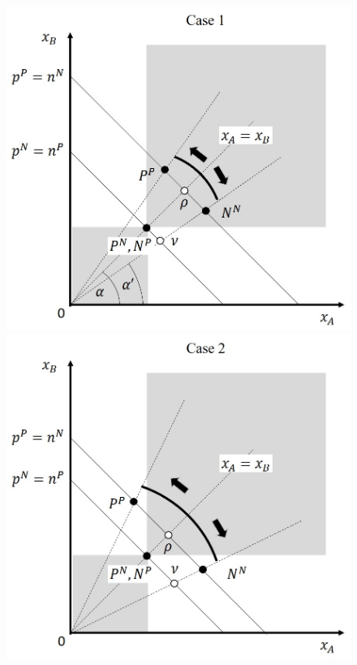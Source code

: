 \documentclass[smallcondensed]{svjour3}
\begin{document}
\begin{figure}[ht!]
   \centering
   \includegraphics[scale=0.4]{figures/main_design_case_1.jpg}\includegraphics[scale=0.4]{figures/main_design_case_2.jpg}

\end{figure}
\end{document}
